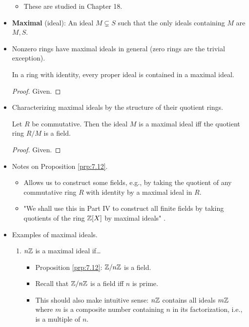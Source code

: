 \documentclass[../notes.tex]{subfiles}
\begin{document}
\begin{itemize}
\begin{itemize}
        \item These are studied in Chapter 18.
    \end{itemize}
    \item \textbf{Maximal} (ideal): An ideal $M\subsetneq S$ such that the only ideals containing $M$ are $M,S$.
    \item Nonzero rings have maximal ideals in general (zero rings are the trivial exception).
    \begin{proposition}\label{prp:7.11}
        In a ring with identity, every proper ideal is contained in a maximal ideal.
        \begin{proof}
            Given.
        \end{proof}
    \end{proposition}
    \item Characterizing maximal ideals by the structure of their quotient rings.
    \begin{proposition}\label{prp:7.12}
        Let $R$ be commutative. Then the ideal $M$ is a maximal ideal iff the quotient ring $R/M$ is a field.
        \begin{proof}
            Given.
        \end{proof}
    \end{proposition}
    \item Notes on Proposition \ref{prp:7.12}.
    \begin{itemize}
        \item Allows us to construct some fields, e.g., by taking the quotient of any commutative ring $R$ with identity by a maximal ideal in $R$.
        \item "We shall use this in Part IV to construct all finite fields by taking quotients of the ring $\mathbb{Z}[X]$ by maximal ideals" \parencite[254]{bib:DummitFoote}.
    \end{itemize}
    \item Examples of maximal ideals.
    \begin{enumerate}
        \item $n\mathbb{Z}$ is a maximal ideal if\dots
        \begin{itemize}
            \item Proposition \ref{prp:7.12}: $\mathbb{Z}/n\mathbb{Z}$ is a field.
            \item Recall that $\mathbb{Z}/n\mathbb{Z}$ is a field iff $n$ is prime.
            \item This should also make intuitive sense: $n\mathbb{Z}$ contains all ideals $m\mathbb{Z}$ where $m$ is a composite number containing $n$ in its factorization, i.e., is a multiple of $n$.

\end{itemize}
\end{enumerate}
\end{itemize}
\end{document}
